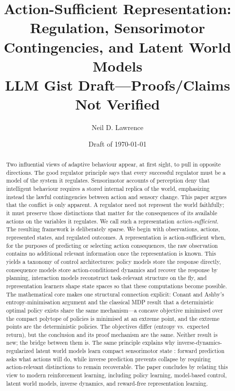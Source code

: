 \documentclass[11pt]{article}
\title{Action-Sufficient Representation:
  Regulation, Sensorimotor Contingencies, and Latent World Models\\
\Large \textbf{LLM Gist Draft---Proofs/Claims Not Verified}}
\author{Neil D. Lawrence}
\date{Draft of \today}
\theoremstyle{remark}
\newcommand{\1}{\mathbb 1}
\begin{document}
\maketitle

\begin{abstract}
Two influential views of adaptive behaviour appear, at first sight, to pull in opposite directions. The good regulator principle says that every successful regulator must be a model of the system it regulates. Sensorimotor accounts of perception deny that intelligent behaviour requires a stored internal replica of the world, emphasizing instead the lawful contingencies between action and sensory change. This paper argues that the conflict is only apparent. A regulator need not represent the world faithfully; it must preserve those distinctions that matter for the consequences of its available actions on the variables it regulates. We call such a representation \emph{action-sufficient}. The resulting framework is deliberately sparse. We begin with observations, actions, represented states, and regulated outcomes. A representation is action-sufficient when, for the purposes of predicting or selecting action consequences, the raw observation contains no additional relevant information once the representation is known. This yields a taxonomy of control architectures: policy models store the response directly, consequence models store action-conditioned dynamics and recover the response by planning, interaction models reconstruct task-relevant structure on the fly, and representation learners shape state spaces so that these computations become possible. The mathematical core makes one structural connection explicit: Conant and Ashby's entropy-minimisation argument and the classical MDP result that a deterministic optimal policy exists share the same mechanism---a concave objective minimised over the compact polytope of policies is minimised at an extreme point, and the extreme points are the deterministic policies. The objectives differ (entropy vs.\ expected return), but the conclusion and its proof mechanism are the same. Neither result is new; the bridge between them is. The same principle explains why inverse-dynamics-regularized latent world models learn compact sensorimotor state \citep{Ivashkov-smwm26}: forward prediction asks what actions will do, while inverse prediction prevents collapse by requiring action-relevant distinctions to remain recoverable. The paper concludes by relating this view to modern reinforcement learning, including policy learning, model-based control, latent world models, inverse dynamics, and reward-free representation learning.
\end{abstract}
\end{document}
